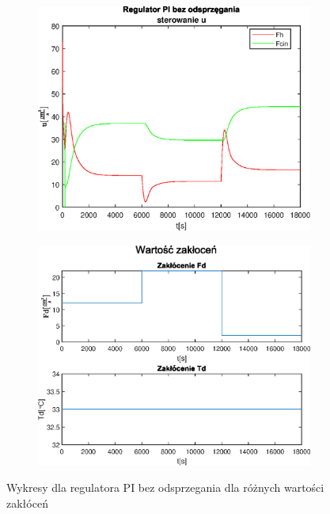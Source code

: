 \begin{figure}[h!]
   \begin{subfigure}[b]{0.4\textwidth}
      \includegraphics[width=1\linewidth]{img/PI/noDecoupler/disturbance/PINoDecouplerControl1.eps}
      \caption{}
      \label{fig:fig:PIDecoupler13}
   \end{subfigure}
       
   \begin{subfigure}[b]{0.4\textwidth}
      \includegraphics[width=1\linewidth]{img/PI/noDecoupler/disturbance/PIDecouplerDisturbance1.eps}
      \caption{}
      \label{fig:fig:PIDecoupler14}
   \end{subfigure}
       
   \caption{Wykresy dla regulatora PI bez odsprzegania dla różnych wartości zakłóceń}
   \label{fig:PIDecoupler1}
\end{figure}
           
